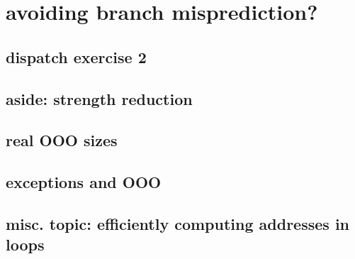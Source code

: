 \section{avoiding branch misprediction?}


\subsection{dispatch exercise 2}

\subsection{aside: strength reduction}


\subsection{real OOO sizes}


\subsection{exceptions and OOO}


\subsection{misc. topic: efficiently computing addresses in loops}




